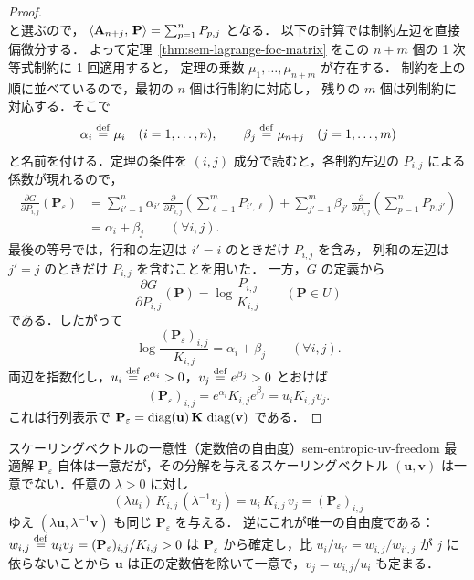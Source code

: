 \begin{proof}
\[  \]
  と選ぶので，
  $\langle \mathbf{A}_{n+j},\, \mathbf{P} \rangle=\sum_{p=1}^{n}P_{p,j}$ となる．
  以下の計算では制約左辺を直接偏微分する．
  よって定理~\ref{thm:sem-lagrange-foc-matrix} をこの $n+m$ 個の 1 次等式制約に 1 回適用すると，
  定理の乗数 $\mu_1,\dots,\mu_{n+m}$ が存在する．
  制約を上の順に並べているので，最初の $n$ 個は行制約に対応し，
  残りの $m$ 個は列制約に対応する．そこで
  \[
    \alpha_i \overset{\mathrm{def}}{=} \mu_i \quad (i=1,\dots,n),
    \qquad
    \beta_j \overset{\mathrm{def}}{=} \mu_{n+j} \quad (j=1,\dots,m)
  \]
  と名前を付ける．定理の条件を $(i,j)$ 成分で読むと，各制約左辺の
  $P_{i,j}$ による係数が現れるので，
  \begin{align*}
    \frac{\partial G}{\partial P_{i,j}}(\mathbf{P}_\varepsilon)
    &=
    \sum_{i'=1}^{n}\alpha_{i'}\,
    \frac{\partial}{\partial P_{i,j}}
    \left(\sum_{\ell=1}^{m}P_{i',\ell}\right)
    +
    \sum_{j'=1}^{m}\beta_{j'}\,
    \frac{\partial}{\partial P_{i,j}}
    \left(\sum_{p=1}^{n}P_{p,j'}\right) \\
    &=
    \alpha_i+\beta_j
    \qquad (\forall i,j).
  \end{align*}
  最後の等号では，行和の左辺は $i'=i$ のときだけ $P_{i,j}$ を含み，
  列和の左辺は $j'=j$ のときだけ $P_{i,j}$ を含むことを用いた．
  一方，$G$ の定義から
  \[
    \frac{\partial G}{\partial P_{i,j}}(\mathbf{P})
    =
    \log\frac{P_{i,j}}{K_{i,j}}
    \qquad (\mathbf{P}\in U)
  \]
  である．したがって
  \[
    \log\frac{(\mathbf{P}_\varepsilon)_{i,j}}{K_{i,j}}
    =
    \alpha_i+\beta_j
    \qquad (\forall i,j).
  \]
  両辺を指数化し，$u_i \overset{\mathrm{def}}{=} e^{\alpha_i} > 0$，$v_j \overset{\mathrm{def}}{=} e^{\beta_j} > 0$ とおけば
  \[
    (\mathbf{P}_\varepsilon)_{i,j}
    =
    e^{\alpha_i} K_{i,j} e^{\beta_j}
    =
    u_i K_{i,j} v_j .
  \]
  これは行列表示で
  $\mathbf{P}_\varepsilon = \operatorname{diag}(\mathbf{u})\,\mathbf{K}\,\operatorname{diag}(\mathbf{v})$
  である．
\end{proof}

\begin{remark}{スケーリングベクトルの一意性（定数倍の自由度）}{sem-entropic-uv-freedom}
  最適解 $\mathbf{P}_\varepsilon$ 自体は一意だが，その分解を与えるスケーリングベクトル
  $(\mathbf{u}, \mathbf{v})$ は一意でない．任意の $\lambda > 0$ に対し
  \[
    (\lambda u_i)\, K_{i,j}\, (\lambda^{-1} v_j) = u_i\, K_{i,j}\, v_j = (\mathbf{P}_\varepsilon)_{i,j}
  \]
  ゆえ $(\lambda\mathbf{u}, \lambda^{-1}\mathbf{v})$ も同じ $\mathbf{P}_\varepsilon$ を与える．
  逆にこれが唯一の自由度である：$w_{i,j} \overset{\mathrm{def}}{=} u_i v_j = (\mathbf{P}_\varepsilon)_{i,j}/K_{i,j} > 0$ は
  $\mathbf{P}_\varepsilon$ から確定し，比 $u_i/u_{i'} = w_{i,j}/w_{i',j}$ が $j$ に依らないことから
  $\mathbf{u}$ は正の定数倍を除いて一意で，$v_j = w_{i,j}/u_i$ も定まる．
\end{remark}

